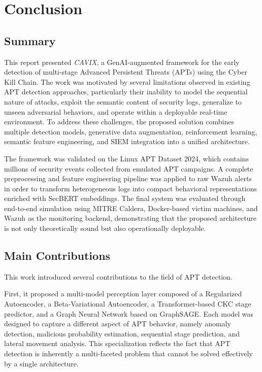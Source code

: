 \chapter{Conclusion}
\label{chap:conclusion}
\section{Summary}

This report presented \textit{CAVIX}, a GenAI-augmented framework for the early detection of multi-stage Advanced Persistent Threats (APTs) using the Cyber Kill Chain. The work was motivated by several limitations observed in existing APT detection approaches, particularly their inability to model the sequential nature of attacks, exploit the semantic content of security logs, generalize to unseen adversarial behaviors, and operate within a deployable real-time environment. To address these challenges, the proposed solution combines multiple detection models, generative data augmentation, reinforcement learning, semantic feature engineering, and SIEM integration into a unified architecture.

The framework was validated on the Linux APT Dataset 2024, which contains millions of security events collected from emulated APT campaigns. A complete preprocessing and feature engineering pipeline was applied to raw Wazuh alerts in order to transform heterogeneous logs into compact behavioral representations enriched with SecBERT embeddings. The final system was evaluated through end-to-end simulation using MITRE Caldera, Docker-based victim machines, and Wazuh as the monitoring backend, demonstrating that the proposed architecture is not only theoretically sound but also operationally deployable.

\section{Main Contributions}

This work introduced several contributions to the field of APT detection.

First, it proposed a multi-model perception layer composed of a Regularized Autoencoder, a Beta-Variational Autoencoder, a Transformer-based CKC stage predictor, and a Graph Neural Network based on GraphSAGE. Each model was designed to capture a different aspect of APT behavior, namely anomaly detection, malicious probability estimation, sequential stage prediction, and lateral movement analysis. This specialization reflects the fact that APT detection is inherently a multi-faceted problem that cannot be solved effectively by a single architecture.

